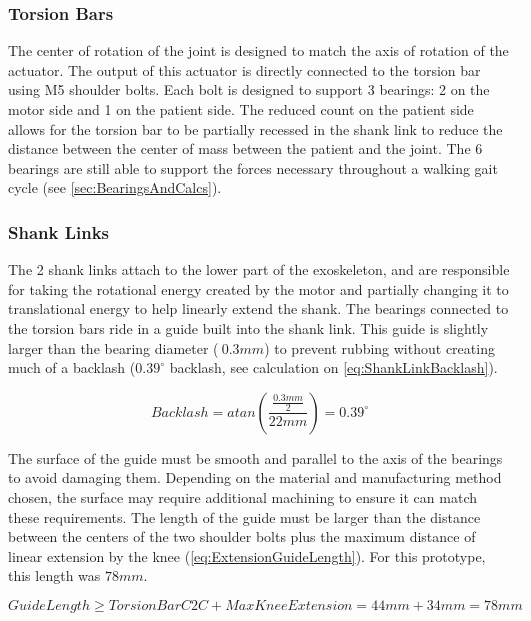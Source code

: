 \subsubsection{Torsion Bars}
The center of rotation of the joint is designed to match the axis of rotation of the actuator. The output of this actuator  is directly connected to the torsion bar using M5 shoulder bolts. Each bolt is designed to support 3 bearings: 2 on the motor side and 1 on the patient side. The reduced count on the patient side allows for the torsion bar to be partially recessed in the shank link to reduce the distance between the center of mass between the patient and the joint. The 6 bearings are still able to support the forces necessary throughout a walking gait cycle (see \autoref{sec:BearingsAndCalcs}). 

\subsubsection{Shank Links}
The 2 shank links attach to the lower part of the exoskeleton, and are responsible for taking the rotational energy created by the motor and partially changing it to translational energy to help linearly extend the shank. The bearings connected to the torsion bars ride in a guide built into the shank link. This guide is slightly larger than the bearing diameter (\(~0.3mm\)) to prevent rubbing without creating much of a backlash (\(0.39^\circ\) backlash, see calculation on \autoref{eq:ShankLinkBacklash}).

\begin{equation}
    Backlash = atan(\frac{\frac{0.3mm}{2}}{22mm}) = 0.39^\circ
    \label{eq:ShankLinkBacklash}
\end{equation}

The surface of the guide must be smooth and parallel to the axis of the bearings to avoid damaging them. Depending on the material and manufacturing method chosen, the surface may require additional machining to ensure it can match these requirements. The length of the guide must be larger than the distance between the centers of the two shoulder bolts plus the maximum distance of linear extension by the knee (\autoref{eq:ExtensionGuideLength}). For this prototype, this length was \(78mm\).

\begin{equation}
    GuideLength \geq TorsionBarC2C + MaxKneeExtension = 44mm + 34mm = 78mm
    \label{eq:ExtensionGuideLength}
\end{equation}

